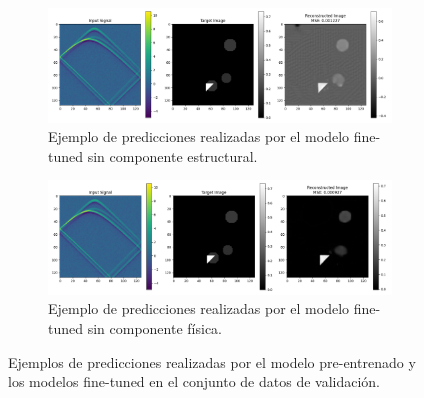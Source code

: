 \begin{figure}[H]
    \vspace{0.5cm}
    
    \begin{subfigure}[b]{0.8\textwidth}
        \centering
        \includegraphics[width=\textwidth]{Images/sample_no_struct.png}
        \caption{Ejemplo de predicciones realizadas por el modelo fine-tuned sin componente estructural.}
        \label{fig:sample_no_struct}
    \end{subfigure}
    
    \begin{subfigure}[b]{0.8\textwidth}
        \centering
        \includegraphics[width=\textwidth]{Images/sample_no_phy.png}
        \caption{Ejemplo de predicciones realizadas por el modelo fine-tuned sin componente física.}
        \label{fig:sample_no_phy}
    \end{subfigure}

    \caption{Ejemplos de predicciones realizadas por el modelo pre-entrenado y los modelos fine-tuned en el conjunto de datos de validación.}
    \label{fig:sample_analysis}
\end{figure}



